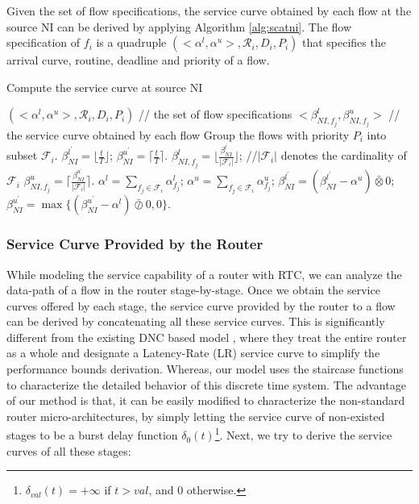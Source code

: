 \documentclass[preprint]{elsarticle}
\begin{document}
Given the set of flow specifications, the service curve obtained by each flow at the source NI can be derived by applying Algorithm \ref{alg:scatni}. The flow specification of $f_i$ is a quadruple $(<\alpha^l,\alpha^u>,\mathcal{R}_i,D_i,P_i)$ that specifies the arrival curve, routine, deadline and priority of a flow.
\begin{algorithm}
\caption{Compute the service curve at source NI}\label{alg:scatni}
\begin{algorithmic}[1]
\Require $(<\alpha^l,\alpha^u>,\mathcal{R}_i,D_i,P_i)$ // the set of flow specifications
\Ensure $<\beta_{NI,f_j}^l,\beta_{NI,f_j}^u>$ // the service curve obtained by each flow
\State Group the flows with priority $P_i$ into subset $\mathcal{F}_i$.
\State $\beta_{NI}^{l^\prime}=\lfloor\frac{t}{T}\rfloor$; $\beta_{NI}^{u^\prime}=\lceil\frac{t}{T}\rceil$.
        \State $\beta_{NI,f_j}^l=\lfloor\frac{\beta_{NI}^{l^\prime}}{|\mathcal{F}_i|}\rfloor$; //$|\mathcal{F}_i|$ denotes the cardinality of $\mathcal{F}_i$
        \State $\beta_{NI,f_j}^u=\lceil\frac{\beta_{NI}^{u^\prime}}{|\mathcal{F}_i|}\rceil$.
    \EndFor
    \State $\alpha^l=\sum_{f_j\in \mathcal{F}_i}\alpha^l_{f_j}$; $\alpha^u=\sum_{f_j\in \mathcal{F}_i}\alpha^u_{f_j}$;
    \State $\beta_{NI}^{l^\prime}=(\beta_{NI}^{l^\prime}-\alpha^u)\bar{\otimes}0$; $\beta_{NI}^{u^\prime}=\max\{(\beta_{NI}^{u^\prime}-\alpha^l)\bar{\oslash}0,0\}$.
\EndFor
\end{algorithmic}
\end{algorithm}

\subsubsection{Service Curve Provided by the Router}\label{router}
While modeling the service capability of a router with RTC, we can analyze the data-path of a flow in the router stage-by-stage. Once we obtain the service curves offered by each stage, the service curve provided by the router to a flow can be derived by concatenating all these service curves. This is significantly different from the existing DNC based model \cite{qian2009analysis,Qian489900}, where they treat the entire router as a whole and designate a Latency-Rate (LR) service curve \cite{Boudec2001Network} to simplify the performance bounds derivation. Whereas, our model uses the staircase functions to characterize the detailed behavior of this discrete time system. The advantage of our method is that, it can be easily modified to characterize the non-standard router micro-architectures, by simply letting the service curve of non-existed stages to be a burst delay function $\delta_0(t)$\footnote{$\delta_{val}(t)=+\infty$ if $t>val$, and 0 otherwise.}. Next, we try to derive the service curves of all these stages:
\end{document}
